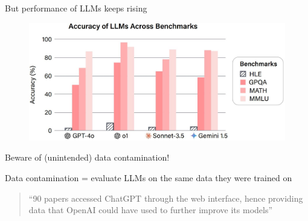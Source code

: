 \documentclass[12pt,aspectratio=169,handout]{beamer}
\begin{document}
\begin{frame}{But performance of LLMs keeps rising}
\begin{figure}
\includegraphics[width=\linewidth]{img/humanitylastexam.jpg}
\end{figure}



\end{frame}



\begin{frame}{Beware of (unintended) data contamination!}

Data contamination = evaluate LLMs on the same data they were trained on

\bigskip

\begin{quote}
``90 papers accessed ChatGPT through the web interface, hence providing data that OpenAI could have used to further improve its models''
\end{quote}


\end{frame}
\end{document}
